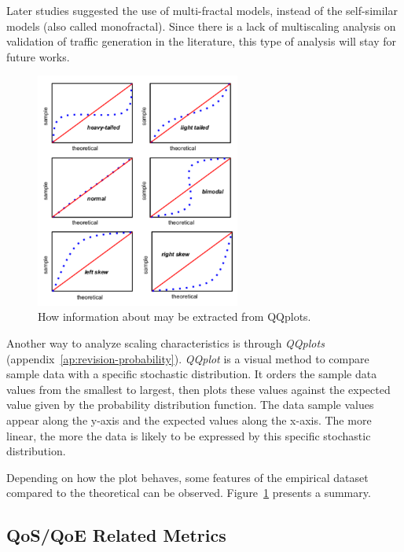 Later studies suggested the use of multi-fractal models, instead of the self-similar models (also called monofractal)\cite{validate-trafficgen}\cite{udp-flows-model}. Since there is a lack of multiscaling analysis on validation of traffic generation in the literature, this type of analysis will stay for future works.

\begin{figure}[ht!]
    \centering
    \includegraphics[width=0.6\textwidth]{figures/ch2/qqplot-tutorial}
    \caption{ How information about may be extracted from QQplots.}
    \label{fig:qqplot-tutorial}
\end{figure}


Another way to analyze scaling characteristics is through \textit{QQplots} (appendix~\ref{ap:revision-probability}). \textit{\acrshort{QQplot}} is a visual method to compare sample data with a specific stochastic distribution. It orders the sample data values from the smallest to largest, then plots these values against the expected value given by the probability distribution function. The data sample values appear along the y-axis and the expected values along the x-axis. The more linear, the more the data is likely to be expressed by this specific stochastic distribution. 

Depending on how the plot behaves, some features of the empirical dataset compared to the theoretical can be observed. Figure~\ref{fig:qqplot-tutorial} presents a summary.


\subsection{QoS/QoE Related Metrics}


